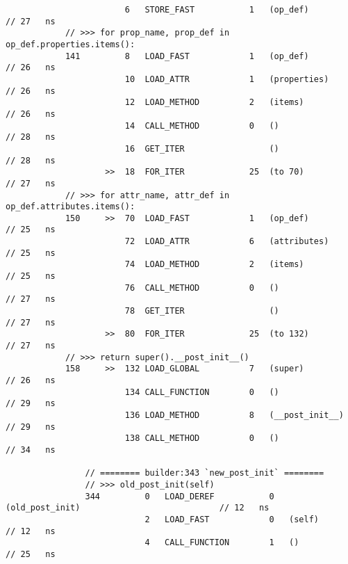 \begin{code}
\begin{verbatim}
                        6   STORE_FAST           1   (op_def)                                       // 27   ns
            // >>> for prop_name, prop_def in op_def.properties.items():
            141         8   LOAD_FAST            1   (op_def)                                       // 26   ns
                        10  LOAD_ATTR            1   (properties)                                   // 26   ns
                        12  LOAD_METHOD          2   (items)                                        // 26   ns
                        14  CALL_METHOD          0   ()                                             // 28   ns
                        16  GET_ITER                 ()                                             // 28   ns
                    >>  18  FOR_ITER             25  (to 70)                                        // 27   ns
            // >>> for attr_name, attr_def in op_def.attributes.items():
            150     >>  70  LOAD_FAST            1   (op_def)                                       // 25   ns
                        72  LOAD_ATTR            6   (attributes)                                   // 25   ns
                        74  LOAD_METHOD          2   (items)                                        // 25   ns
                        76  CALL_METHOD          0   ()                                             // 27   ns
                        78  GET_ITER                 ()                                             // 27   ns
                    >>  80  FOR_ITER             25  (to 132)                                       // 27   ns
            // >>> return super().__post_init__()
            158     >>  132 LOAD_GLOBAL          7   (super)                                        // 26   ns
                        134 CALL_FUNCTION        0   ()                                             // 29   ns
                        136 LOAD_METHOD          8   (__post_init__)                                // 29   ns
                        138 CALL_METHOD          0   ()                                             // 34   ns

                // ======== builder:343 `new_post_init` ========
                // >>> old_post_init(self)
                344         0   LOAD_DEREF           0   (old_post_init)                            // 12   ns
                            2   LOAD_FAST            0   (self)                                     // 12   ns
                            4   CALL_FUNCTION        1   ()                                         // 25   ns


\end{verbatim}
\end{code}
